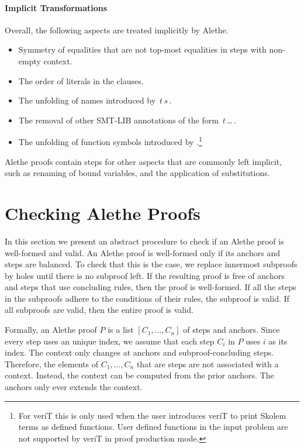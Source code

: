 \documentclass{scrartcl}
\newcommand\smtlib{SMT-LIB}
\newcommand\tool[1]{\textsf{#1}}
\newcommand\verit{\tool{veriT}}
\theoremstyle{definition}
\begin{document}
\paragraph{Implicit Transformations}
Overall, the following aspects are treated implicitly by Alethe.
\begin{itemize}
  \item Symmetry of equalities that are not top-most equalities in steps with
        non-empty context.
  \item The order of literals in the clauses.
  \item The unfolding of names introduced by
     \inlineAlethe{(!}\,$t$\,\;$s$\,\inlineAlethe{)}.
  \item The removal of other {\smtlib} annotations of the form
     \inlineAlethe{(!}\,$t$\,\dots\,\inlineAlethe{)}.
  \item The unfolding of function symbols introduced by
  .\footnote{For {\verit} this is only used when the user
  introduces {\verit} to print Skolem terms as defined functions. User defined
  functions in the input problem are not supported by {\verit} in proof production
  mode.}
\end{itemize}

Alethe proofs contain steps for other aspects that are commonly left implicit, such
as renaming of bound variables, and the application of substitutions.

\section{Checking Alethe Proofs}
\label{sec:alethe:semantic}

In this section we present an abstract procedure to check if an Alethe
proof is well-formed and valid.  An Alethe proof is
well-formed only if its anchors and steps are balanced.  To check that
this is the case, we replace innermost subproofs by holes until there is
no subproof left.  If the resulting proof is free of anchors and steps
that use concluding rules, then the proof is well-formed.
If all the steps in the subproofs adhere to the conditions of
their rules, the subproof is valid.  If all subproofs are valid,
then the entire proof is valid.

Formally, an Alethe proof $P$ is a list $[C_1, \dots, C_n]$ of steps
and anchors.
Since every step uses an unique index, we assume that each step
$C_i$ in $P$ uses $i$ as its index.
The context
only changes at anchors and subproof-concluding steps.
Therefore, the elements of $C_1, \dots, C_n$ that are steps
are not associated with a context.  
Instead, the context can be computed
from the prior anchors.
The anchors only ever extends the context. 
\end{document}
